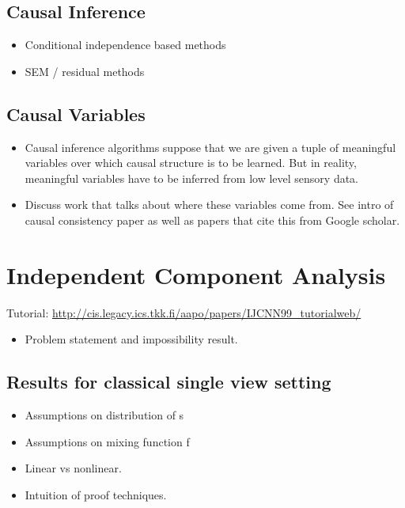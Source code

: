 \subsection{Causal Inference}
\begin{itemize}
\item Conditional independence based methods
\item SEM / residual methods
\end{itemize}

\subsection{Causal Variables}
\begin{itemize}
\item Causal inference algorithms suppose that we are given a tuple of meaningful variables over which causal structure is to be learned. But in reality, meaningful variables have to be inferred from low level sensory data. 
\item Discuss work that talks about where these variables come from. See intro of causal consistency paper as well as papers that cite this from Google scholar.
\end{itemize}


\section{Independent Component Analysis}

Tutorial: \url{http://cis.legacy.ics.tkk.fi/aapo/papers/IJCNN99_tutorialweb/}

\begin{itemize}
\item Problem statement and impossibility result.
\end{itemize}

\subsection{Results for classical single view setting}

\begin{itemize}
\item Assumptions on distribution of s
\item Assumptions on mixing function f
\item Linear vs nonlinear.
\item Intuition of proof techniques.
\end{itemize}

